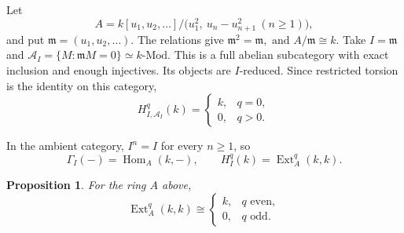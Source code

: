 \documentclass[11pt,reqno]{amsart}
\newtheorem{proposition}[theorem]{Proposition}
\theoremstyle{definition}
\theoremstyle{remark}
\newcommand{\Mod}{\text{-}\mathrm{Mod}}
\newcommand{\Hom}{\operatorname{Hom}}
\newcommand{\Ext}{\operatorname{Ext}}
\newcommand{\A}{\mathcal A_I}
\begin{document}
Let
\[
A=
k[u_1,u_2,\ldots]\Big/
\bigl(u_1^2,\ u_n-u_{n+1}^2\ (n\geq 1)\bigr),
\]
and put
\(\mathfrak m=(u_1,u_2,\ldots).\)
The relations give \(\mathfrak m^2=\mathfrak m, \text{ and } A/\mathfrak m\cong k.\)
Take $I=\mathfrak m$ and \(\A=\{M:\mathfrak mM=0\}\simeq k\Mod.\)
This is a full abelian subcategory with exact inclusion
and enough injectives. Its objects are $I$-reduced. Since restricted torsion is the identity on this category,
\[H^q_{I,\A}(k)=
\begin{cases}
k,&q=0,\\
0,&q>0.
\end{cases}
\]

In the ambient category, $I^n=I$ for every $n\geq 1$,
so
\[
\Gamma_I(-)=\Hom_A(k,-),
\qquad
H_I^q(k)=\Ext_A^q(k,k).
\]

\begin{proposition}\label{prop:even-ext}
For the ring $A$ above,
\[
\Ext_A^q(k,k)\cong
\begin{cases}
k,&q\text{ even},\\
0,&q\text{ odd}.
\end{cases}
\]
\end{proposition}
\end{document}
